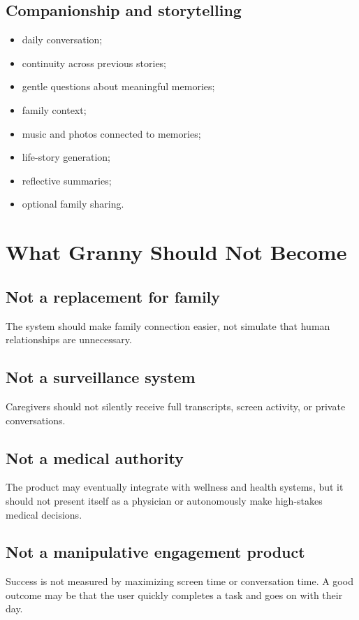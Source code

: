 \documentclass[11pt]{article}
\begin{document}
\subsection{Companionship and storytelling}
\begin{itemize}[leftmargin=*]
    \item daily conversation;
    \item continuity across previous stories;
    \item gentle questions about meaningful memories;
    \item family context;
    \item music and photos connected to memories;
    \item life-story generation;
    \item reflective summaries;
    \item optional family sharing.
\end{itemize}

\section{What Granny Should Not Become}

\subsection{Not a replacement for family}
The system should make family connection easier, not simulate that human relationships are unnecessary.

\subsection{Not a surveillance system}
Caregivers should not silently receive full transcripts, screen activity, or private conversations.

\subsection{Not a medical authority}
The product may eventually integrate with wellness and health systems, but it should not present itself as a physician or autonomously make high-stakes medical decisions.

\subsection{Not a manipulative engagement product}
Success is not measured by maximizing screen time or conversation time. A good outcome may be that the user quickly completes a task and goes on with their day.
\end{document}
